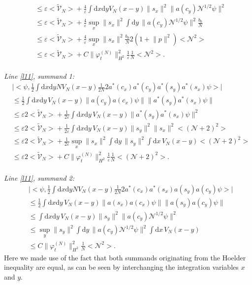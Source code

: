 \documentclass[11pt,a4paper,draft,DIV11]{scrartcl}	%
\newcommand{\di}{\textrm{d}}		%
\newcommand{\Ncal}{\mathcal{N}}		%
\newcommand{\tilV}{\tilde{\mathcal{V}}_N}		%
\newcommand{\estlist}[2]{\emph{\vspace{.3em}\\Line \ref{l#1}, summand #2:}}
\newcommand{\scal}[2]{\big<#1,#2\big>} %
\newcommand{\norm}[1]{\lVert#1\rVert}	%
\newcommand{\ev}[1]{\big<#1\big>}	%
\newcommand{\ph}{\varphi_t^{(N)}}	%
\newcommand{\dxyNV}{\frac{1}{2}\int \di x\di y N V_N(x-y)} %
\begin{document}
\begin{fleqn}[0.5em]
\begin{align*}
& \leq \varepsilon \ev{\tilV} + \frac{4}{\varepsilon}\int \di x\di y V_N(x-y) \norm{s_x}^2 \norm{a(c_y)\Ncal^{1/2}\psi}^2 \\
& \leq \varepsilon \ev{\tilV} + \frac{4}{\varepsilon} \sup_x \norm{s_x}^2 \int \di y\, \norm{a(c_y)\Ncal^{1/2}\psi}^2 \frac{b_0}{N}\\
& \leq \varepsilon \ev{\tilV} + \frac{4}{\varepsilon} \sup_x \norm{s_x}^2 \frac{b_0}{N} 2 (1+\norm{p}^2)\ev{\Ncal^2} \\
& \leq \varepsilon \ev{\tilV} + C\norm{\ph}_{H^2}^2 \frac{1}{\varepsilon} \frac{1}{N}\ev{\Ncal^2}.
\end{align*}
\estlist{11}{1}
\begin{align*}
& \lvert \scal{\psi}{\dxyNV \frac{1}{2N}2a^\ast(c_x)a^\ast(c_y) a^\ast(s_y) a^\ast(s_x) \psi}\rvert \\
& \leq \frac{1}{2}\int \di x\di y\, V_N(x-y)  \norm{a(c_y)a(c_x)\psi} \norm{a^\ast(s_y)a^\ast(s_x)\psi} \\
& \leq \varepsilon 2 \ev{\tilV} + \frac{1}{2\varepsilon} \int \di x\di y\, V_N(x-y) \norm{a^\ast(s_y)a^\ast(s_x)\psi}^2 \\
& \leq \varepsilon 2 \ev{\tilV} + \frac{1}{2\varepsilon} \int \di x\di y\, V_N(x-y) \norm{s_y}^2 \norm{s_x}^2 \ev{(\Ncal+2)^2} \\
& \leq \varepsilon 2 \ev{\tilV} + \frac{1}{2\varepsilon} \sup_x \norm{s_x}^2 \int \di y\, \norm{s_y}^2 \int \di x\, V_N(x-y) \ev{(\Ncal+2)^2} \\
& \leq \varepsilon 2\ev{\tilV} + C\norm{\ph}_{H^2}^2 \frac{1}{\varepsilon} \frac{1}{N}\ev{(\Ncal+2)^2}.
\end{align*}
\estlist{11}{2}
\begin{align*}
& \lvert \scal{\psi}{\dxyNV \frac{1}{2N} 2 a^\ast(c_x) a^\ast(s_x) a(s_y) a(c_y)\psi}\rvert \\
& \leq \frac{1}{2}\int \di x\di y\, V_N(x-y) \norm{a(s_x) a(c_x) \psi} \norm{a(s_y) a(c_y)\psi} \\
& \leq \int \di x\di y\, V_N(x-y) \norm{s_y}^2 \norm{a(c_y) \Ncal^{1/2}\psi}^2\\
& \leq \sup_y \norm{s_y}^2 \int \di y\, \norm{a(c_y)\Ncal^{1/2}\psi}^2 \int \di x\, V_N(x-y)\\
& \leq C \norm{\ph}_{H^2}^2 \frac{1}{N}\ev{\Ncal^2}.
\end{align*}
Here we made use of the fact that both summands originating from the Hoelder inequality are equal, as can be seen by interchanging the integration variables $x$ and $y$.\newline

\end{fleqn}
\end{document}
